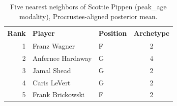 \begin{table}[htbp]
  \centering\small
  \begin{tabular}{rllc}
    \toprule
    Rank & Player & Position & Archetype \\
    \midrule
    1 & Franz Wagner & F & 2 \\
    2 & Anfernee Hardaway & G & 4 \\
    3 & Jamal Shead & G & 2 \\
    4 & Caris LeVert & G & 2 \\
    5 & Frank Brickowski & F & 2 \\
    \bottomrule
  \end{tabular}
  \caption{Five nearest neighbors of Scottie Pippen (peak_age modality), Procrustes-aligned posterior mean.}
  \label{tab:Scottie_Pippen_neighbors_peak_age}
\end{table}

